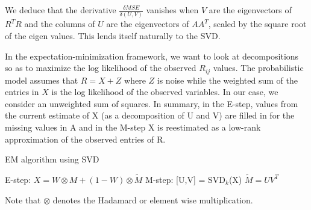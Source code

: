 \documentclass[journal,onecolumn]{IEEEtran}
\begin{document}
We deduce that the derivative $ \frac{\delta MSE}{\delta(U,V)} $ vanishes when $ V $ are the eigenvectors of $ R^TR $ and the columns of $ U $ are the eigenvectors of $ AA^T $, scaled by the square root of the eigen values. This lends itself naturally to the SVD.

In the expectation-minimization framework, we want to look at decompositions so as to maximize the log likelihood of the observed $ R_{ij} $ values. The probabilistic model assumes that $ R = X + Z $ where $ Z $ is noise while the weighted sum of the entries in $ X $ is the log likelihood of the observed variables. In our case, we consider an unweighted sum of squares. In summary, in the E-step, values from the current estimate of X (as a decomposition of U and V) are filled in for the missing values in A and in the M-step X is reestimated as a low-rank approximation of the observed entries of R.

\begin{algorithm}[H]
	\caption{EM algorithm using SVD}
	\begin{algorithmic}
		\STATE E-step: \hspace{2em} $ X = W \otimes M + (1-W)\otimes \widetilde{M} $
		\STATE M-step: \hspace{2em} [U,V] = SVD$_k$(X)
		\STATE \hspace{6em} $ \widetilde{M}  =  UV^T $
	\end{algorithmic}
\end{algorithm}
Note that $ \otimes $ denotes the Hadamard or element wise multiplication.
\end{document}
